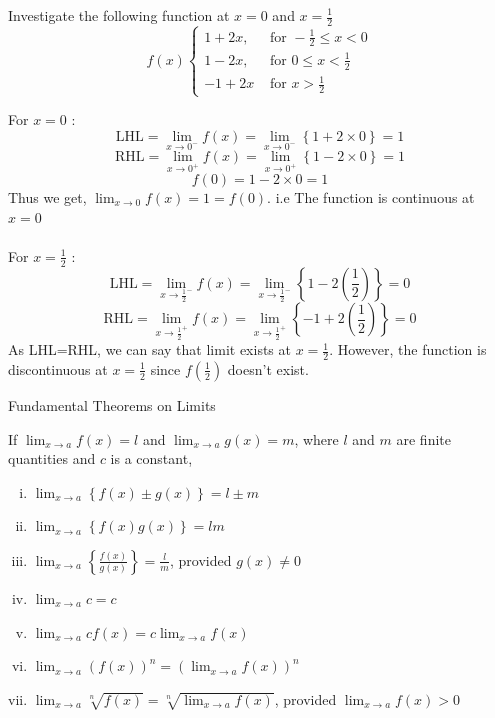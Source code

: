 \documentclass[12pt]{article}
\begin{document}
\begin{example}{
        Investigate the following function at $x=0$ and $x=\frac{1}{2}$ \\
        \begin{equation*}
            f(x)
            \begin{cases}
                1+2x, &\text{ for }-\frac{1}{2}\le x<0 \\
                1-2x, &\text{ for }0\le x<\frac{1}{2} \\
                -1+2x &\text{ for }x>\frac{1}{2}
            \end{cases}
        \end{equation*}
    }

        For $x=0$ :
        \[ \text{LHL} = \lim_{x \to 0^-} f(x) = \lim_{x \to 0^-} \left\{ 1 + 2 \times 0 \right\} = 1 \]
        \[ \text{RHL} = \lim_{x \to 0^+} f(x) = \lim_{x \to 0^+} \left\{ 1 - 2 \times 0 \right\} = 1 \]
        \[ f(0) = 1-2\times0 = 1 \]
        Thus we get, $\lim_{x \to 0} f(x) = 1 = f(0)$. i.e The function is continuous at $x=0$ \\~\\

        For $x=\frac{1}{2}$ :
        \[ \text{LHL} = \lim_{x \to \frac{1}{2}^-} f(x) = \lim_{x \to \frac{1}{2}^-} \left\{ 1 - 2\left( \frac{1}{2} \right)  \right\} = 0 \]
        \[ \text{RHL} = \lim_{x \to \frac{1}{2}^+} f(x) = \lim_{x \to \frac{1}{2}^+} \left\{ -1 + 2\left( \frac{1}{2} \right)  \right\} = 0 \]
        As LHL=RHL, we can say that limit exists at $x=\frac{1}{2}$. However, the function is discontinuous at $x=\frac{1}{2}$ since $f\left( \frac{1}{2} \right) $ doesn't exist.
\end{example}

\begin{theorem}{Fundamental Theorems on Limits}
    
    If $\lim_{x \to a} f(x) = l$ and $\lim_{x \to a} g(x) = m$, where $l$ and $m$ are finite quantities and $c$ is a constant,
    \begin{enumerate}[(i)]
        \item $ \lim_{x \to a} \left\{ f(x) \pm g(x) \right\} = l \pm m $
        \item $ \lim_{x \to a} \left\{ f(x)g(x) \right\} = lm $ 
        \item $ \lim_{x \to a} \left\{ \frac{f(x)}{g(x)} \right\} = \frac{l}{m} $, provided $g(x)\neq 0$
        \item $ \lim_{x \to a} c = c $
        \item $ \lim_{x \to a} c f(x) = c \lim_{x \to a} f(x) $
        \item $ \lim_{x \to a} \left( f(x) \right)^n = \left( \lim_{x \to a} f(x) \right)^n $
        \item $ \lim_{x \to a} \sqrt[n]{f(x)} = \sqrt[n]{\lim_{x \to a} f(x)} $, provided $\lim_{x \to a} f(x) > 0$
    \end{enumerate}
\end{theorem}
\end{document}
